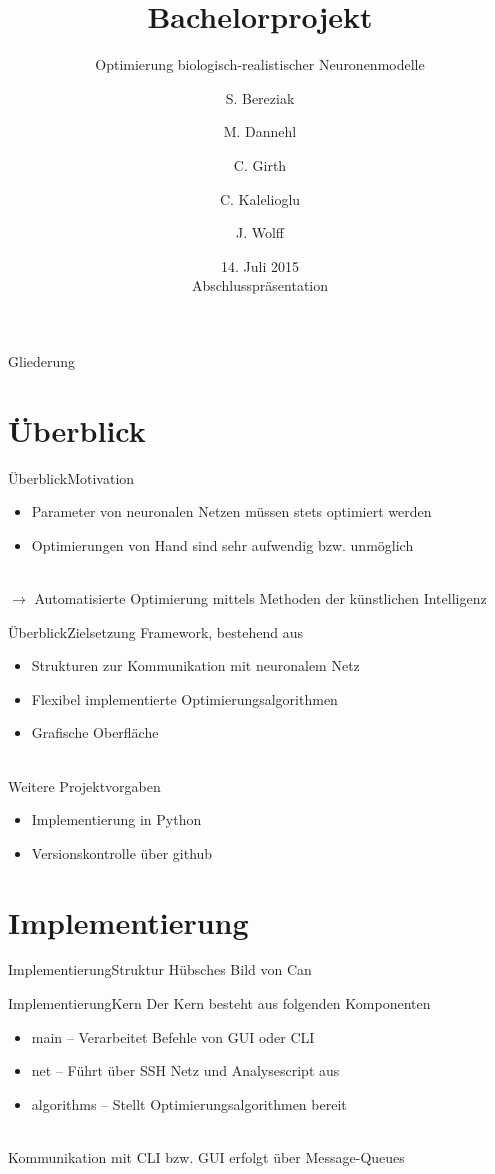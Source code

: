 \documentclass[ngerman,10pt,xcolor=colortbl,compress
]{beamer}
\title{Bachelorprojekt }
\subtitle{Optimierung biologisch-realistischer Neuronenmodelle}
\date[]{14. Juli 2015\\[1ex]Abschlusspräsentation}
\author[Bereziak \and Dannehl \and Girth \and Kalelioglu \and Wolff]{S. Bereziak \and M. Dannehl \and C. Girth \and C. Kalelioglu \and J. Wolff}
\institute[UzL]{Institut für Robotik und kognitive Systeme\\Universität zu Lübeck}
\begin{document}
	\maketitle
	\begin{frame}{Gliederung}
		\tableofcontents
	\end{frame}	
	\section{Überblick}
	\begin{frame}{Überblick}{Motivation}
	\begin{itemize}
	\item Parameter von neuronalen Netzen müssen stets optimiert werden
	\item Optimierungen von Hand sind sehr aufwendig bzw. unmöglich
	\end{itemize}
	\mbox{}\\
	$\rightarrow$ Automatisierte Optimierung mittels Methoden der künstlichen Intelligenz
	\end{frame}
	\begin{frame}{Überblick}{Zielsetzung}
	Framework, bestehend aus
	\begin{itemize}
		\item Strukturen zur Kommunikation mit neuronalem Netz
		\item Flexibel implementierte Optimierungsalgorithmen
		\item Grafische Oberfläche
	\end{itemize}
	\mbox{}\\
	Weitere Projektvorgaben
	\begin{itemize}
		\item Implementierung in Python
		\item Versionskontrolle über github
	\end{itemize}
	\end{frame}
	
	\section{Implementierung}
	
	\begin{frame}{Implementierung}{Struktur}
	Hübsches Bild von Can
	\end{frame}
	\begin{frame}{Implementierung}{Kern}
	Der Kern besteht aus folgenden Komponenten
	\begin{itemize}
		\item main -- Verarbeitet Befehle von GUI oder CLI
		\item net -- Führt über SSH Netz und Analysescript aus
		\item algorithms -- Stellt Optimierungsalgorithmen bereit 
	\end{itemize}
	\mbox{}\\
	Kommunikation mit CLI bzw. GUI erfolgt über Message-Queues
	\end{frame}
	
\end{document}
